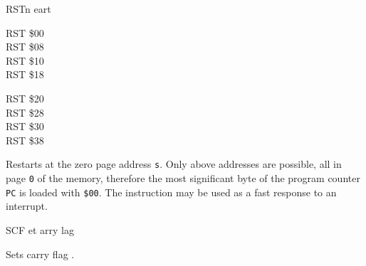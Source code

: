\begin{basedescript}{
	\desclabelstyle{\multilinelabel}
	\desclabelwidth{3cm}}
	\begin{DetailItem}{RST}{n}
		{eart}
		{}

		\begin{DetailVariants}
			RST \$00\\
			RST \$08\\
			RST \$10\\
			RST \$18
			
			\columnbreak
			RST \$20\\
			RST \$28\\
			RST \$30\\
			RST \$38
		\end{DetailVariants}

		Restarts at the zero page address {\tt s}. Only above addresses are possible, all in page {\tt 0} of the memory, therefore the most significant byte of the program counter {\tt PC} is loaded with {\tt \$00}. The instruction may be used as a fast response to an interrupt.

		\begin{DetailEffects}
			\FlagsRSTn				
		\end{DetailEffects}

		\begin{DetailTiming}
			\DetailTime{3}{11}
		\end{DetailTiming}

	\end{DetailItem}

	\DetailItemSeePageReference{SBC}


	\begin{DetailItem}{SCF}{}
		{et arry \IH{F}lag}
		{\SymSCF}

		Sets carry flag \FlagCF{}.

		\begin{DetailEffects}
			\FlagsSCF
		\end{DetailEffects}
						

\end{DetailItem}
\end{basedescript}
